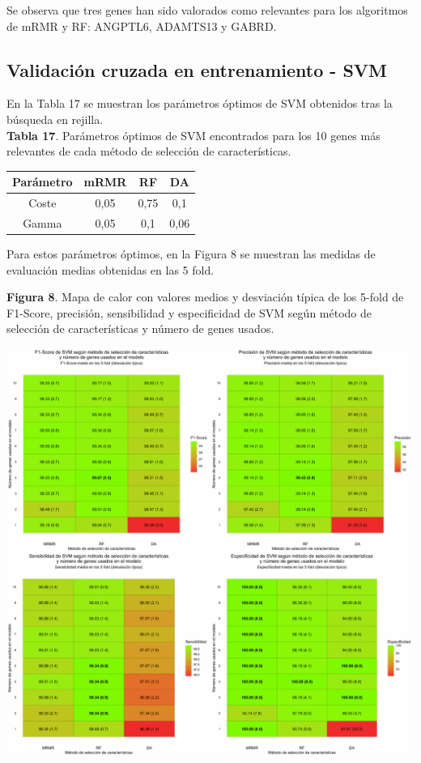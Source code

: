 Se observa que tres genes han sido valorados como relevantes para los algoritmos de mRMR y RF:  ANGPTL6, ADAMTS13 y GABRD.

\subsection{Validación cruzada en entrenamiento - SVM}

En la Tabla 17 se muestran los parámetros óptimos de SVM obtenidos tras la búsqueda en rejilla.\\

\textbf{Tabla 17}. Parámetros óptimos de SVM encontrados para los 10 genes más relevantes de cada método de selección de características.

\begin{table}[H]
	\centering
	\begin{tabular}{cccc}
		\hline
		\textbf{Parámetro} & \textbf{mRMR} & \textbf{RF} & \textbf{DA} \\ \hline
		Coste                &    0,05 &    0,75     &   0,1       \\
		Gamma               &     0,05    &     0,1   & 0,06        \\ \hline
	\end{tabular}
\end{table}

Para estos parámetros óptimos, en la Figura 8 se muestran las medidas de evaluación medias obtenidas en las 5 fold.\\

\newpage
\begin{center}
\textbf{Figura 8}. Mapa de calor con valores medios y desviación típica de los 5-fold de F1-Score, precisión, sensibilidad y especificidad de SVM según método de selección de características y número de genes usados.
\end{center}
\begin{center}
	\includegraphics[width=1\textwidth]{figuras/08_higado_biclase_heatmap_svm.pdf} 
\end{center}

